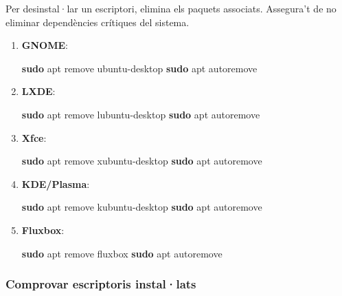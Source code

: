 \documentclass[
  a4paper,
]{article}
\newenvironment{Shaded}{\begin{snugshade}}{\end{snugshade}}
\newcommand{\FunctionTok}[1]{\textcolor[rgb]{0.13,0.29,0.53}{\textbf{#1}}}
\newcommand{\NormalTok}[1]{#1}
\begin{document}
Per desinstal·lar un escriptori, elimina els paquets associats.
Assegura't de no eliminar dependències crítiques del sistema.

\begin{enumerate}
\def\labelenumi{\arabic{enumi}.}
\item
  \textbf{GNOME}:

\begin{Shaded}
\begin{Highlighting}[]
\FunctionTok{sudo}\NormalTok{ apt remove ubuntu{-}desktop}
\FunctionTok{sudo}\NormalTok{ apt autoremove}
\end{Highlighting}
\end{Shaded}
\item
  \textbf{LXDE}:

\begin{Shaded}
\begin{Highlighting}[]
\FunctionTok{sudo}\NormalTok{ apt remove lubuntu{-}desktop}
\FunctionTok{sudo}\NormalTok{ apt autoremove}
\end{Highlighting}
\end{Shaded}
\item
  \textbf{Xfce}:

\begin{Shaded}
\begin{Highlighting}[]
\FunctionTok{sudo}\NormalTok{ apt remove xubuntu{-}desktop}
\FunctionTok{sudo}\NormalTok{ apt autoremove}
\end{Highlighting}
\end{Shaded}
\item
  \textbf{KDE/Plasma}:

\begin{Shaded}
\begin{Highlighting}[]
\FunctionTok{sudo}\NormalTok{ apt remove kubuntu{-}desktop}
\FunctionTok{sudo}\NormalTok{ apt autoremove}
\end{Highlighting}
\end{Shaded}
\item
  \textbf{Fluxbox}:

\begin{Shaded}
\begin{Highlighting}[]
\FunctionTok{sudo}\NormalTok{ apt remove fluxbox}
\FunctionTok{sudo}\NormalTok{ apt autoremove}
\end{Highlighting}
\end{Shaded}
\end{enumerate}

\subsubsection{Comprovar escriptoris
instal·lats}\label{comprovar-escriptoris-installats}
\end{document}
